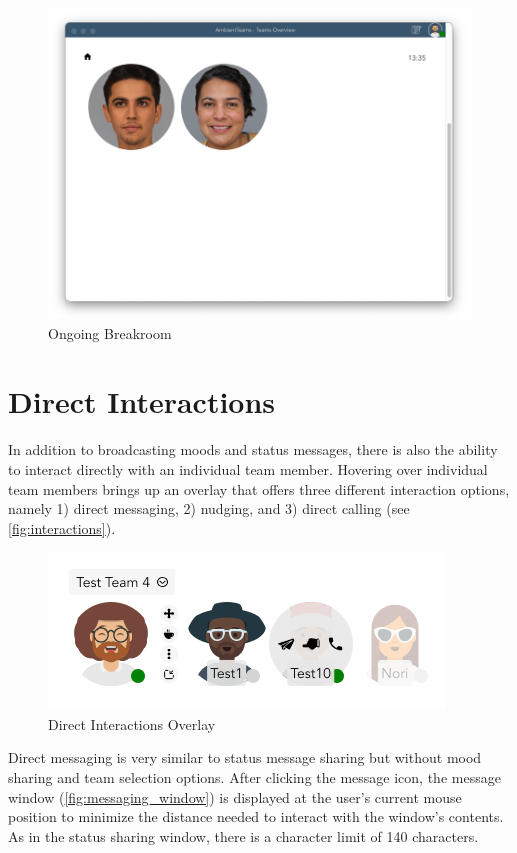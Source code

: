 \begin{figure}[h]
    \centering
    \includegraphics[width=.8\linewidth]{./images/breakroom.png}
    \caption{Ongoing Breakroom}
    \label{fig:breakroom}
\end{figure}

\section{Direct Interactions}
In addition to broadcasting moods and status messages, there is also the ability to interact directly with an individual team member. Hovering over individual team members brings up an overlay that offers three different interaction options, namely 1) direct messaging, 2) nudging, and 3) direct calling (see \autoref{fig:interactions}).

\begin{figure}[h]
    \centering
    \includegraphics[width=.4\linewidth]{./images/interactions.png}
    \caption{Direct Interactions Overlay}
    \label{fig:interactions}
\end{figure}

Direct messaging is very similar to status message sharing but without mood sharing and team selection options. After clicking the message icon, the message window (\autoref{fig:messaging_window}) is displayed at the user's current mouse position to minimize the distance needed to interact with the window's contents. As in the status sharing window, there is a character limit of 140 characters.

